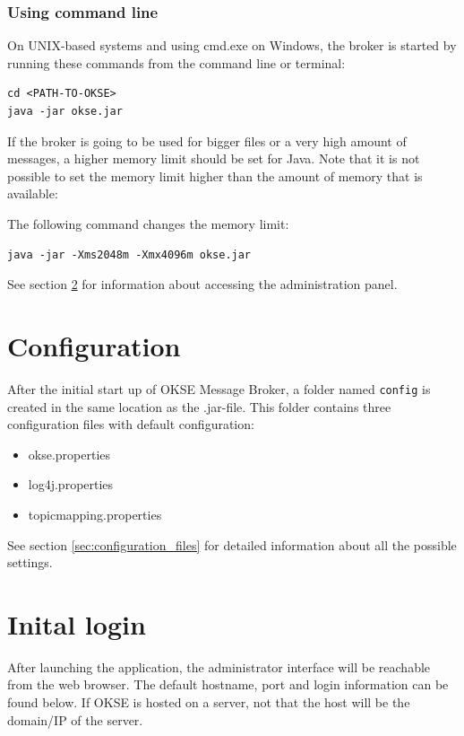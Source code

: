 \subsubsection{Using command line}

On UNIX-based systems and using cmd.exe on Windows, the broker is started by running these commands from the command line or terminal: 
\begin{verbatim}
cd <PATH-TO-OKSE>
java -jar okse.jar
\end{verbatim}

\noindent If the broker is going to be used for bigger files or a very high amount of messages, a higher memory limit should be set for Java. Note that it is not possible to set the memory limit higher than the amount of memory that is available: 

The following command changes the memory limit:

\begin{verbatim}
java -jar -Xms2048m -Xmx4096m okse.jar
\end{verbatim}
See section \ref{sec:inital-login} for information about accessing the administration panel.

\section{Configuration}

After the initial start up of OKSE Message Broker, a folder named \verb!config! is created in the same location as the .jar-file. This folder contains three configuration files with default configuration:

\begin{itemize}
\setlength{\itemsep}{0cm}%
\item okse.properties
\item log4j.properties
\item topicmapping.properties
\end{itemize}

\noindent See section \ref{sec:configuration_files} for detailed information about all the possible settings.

\section{Inital login}
\label{sec:inital-login}

After launching the application, the administrator interface will be reachable from the web browser. The default hostname, port and login information can be found below. If OKSE is hosted on a server, not that the host will be the domain/IP of the server.

